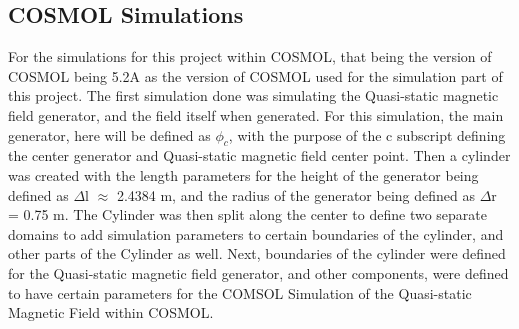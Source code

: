 \documentclass[]{article}
\begin{document}
\subsection{COSMOL Simulations}
For the simulations for this project within COSMOL, that being the version of COSMOL being 5.2A as the version of COSMOL used for the simulation part of this project. The first simulation done was simulating the Quasi-static magnetic field generator, and the field itself when generated. For this simulation, the main generator, here will be defined as $\phi_c$, with the purpose of the c subscript defining the center generator and Quasi-static magnetic field center point. Then a cylinder was created with the length parameters for the height of the generator being defined as $\Delta$l $\approx$ 2.4384 m, and the radius of the generator being defined as $\Delta$r = 0.75 m. The Cylinder was then split along the center to define two separate domains to add simulation parameters to certain boundaries of the cylinder, and other parts of the Cylinder as well. Next, boundaries of the cylinder were defined for the Quasi-static magnetic field generator, and other components, were defined to have certain parameters for the COMSOL Simulation of the Quasi-static Magnetic Field within COSMOL.
\end{document}
